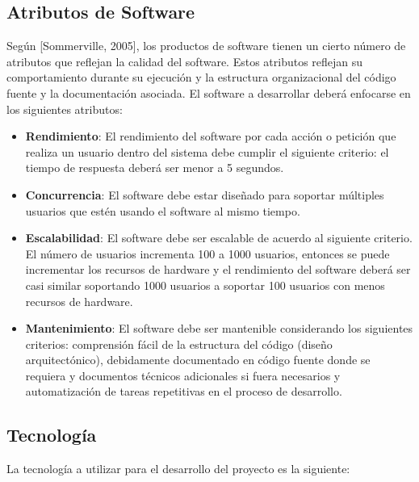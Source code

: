 \subsection{Atributos de Software}
\noindent Según [Sommerville, 2005], los productos de software tienen un cierto número de atributos que reflejan la calidad del software. Estos atributos reflejan su comportamiento durante su ejecución y la estructura organizacional del código fuente y la documentación asociada.
\noindent El software a desarrollar deberá enfocarse en los siguientes atributos:
\begin{itemize}
\item \textbf{Rendimiento}: El rendimiento del software por cada acción o petición que realiza un usuario dentro del sistema debe cumplir el siguiente criterio: el tiempo de respuesta deberá ser menor a 5 segundos.
\item \textbf{Concurrencia}: El software debe estar diseñado para soportar múltiples usuarios que estén usando el software al mismo tiempo.
\item \textbf{Escalabilidad}: El software debe ser escalable de acuerdo al siguiente criterio. El número de usuarios incrementa 100 a 1000 usuarios, entonces se puede incrementar los recursos de hardware y el rendimiento del software deberá ser casi similar soportando 1000 usuarios a soportar 100 usuarios con menos recursos de hardware. 
\item \textbf{Mantenimiento}: El software debe ser mantenible considerando los siguientes criterios: comprensión fácil de la estructura del código (diseño arquitectónico), debidamente documentado en código fuente donde se requiera y documentos técnicos adicionales si fuera necesarios y automatización de tareas repetitivas en el proceso de desarrollo.  
\end{itemize}

\subsection{Tecnología}
\noindent La tecnología a utilizar para el desarrollo del proyecto es la siguiente:

